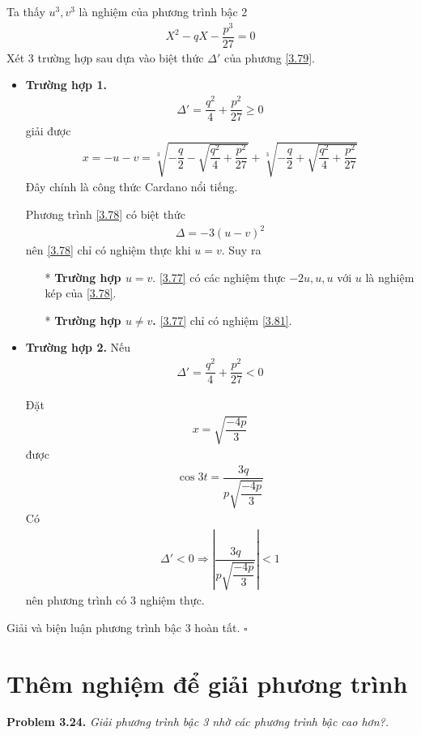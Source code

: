 \documentclass[a4paper,oneside]{book}
\numberwithin{equation}{chapter}
\begin{document}
Ta thấy ${u^3},{v^3}$ là nghiệm của phương trình bậc 2
\begin{align}
\label{3.79}
{X^2} - qX - \dfrac{{{p^3}}}{{27}} = 0
\end{align}
Xét 3 trường hợp sau dựa vào biệt thức $\Delta '$ của phương \eqref{3.79}.
\begin{itemize}
\item \textbf{Trường hợp 1.} 
\begin{align}
\Delta ' = \dfrac{{{q^2}}}{4} + \dfrac{{{p^2}}}{{27}} \ge 0
\end{align}
giải được 
\begin{align}
\label{3.81}
x =  - u - v = \sqrt[3]{{ - \dfrac{q}{2} - \sqrt {\dfrac{{{q^2}}}{4} + \dfrac{{{p^2}}}{{27}}} }} + \sqrt[3]{{ - \dfrac{q}{2} + \sqrt {\dfrac{{{q^2}}}{4} + \dfrac{{{p^2}}}{{27}}} }}
\end{align}
Đây chính là công thức Cardano nổi tiếng.

Phương trình \eqref{3.78} có biệt thức 
\begin{align}
\Delta  =  - 3{\left( {u - v} \right)^2}
\end{align}
nên \eqref{3.78} chỉ có nghiệm thực khi $u = v$. Suy ra
\begin{itemize}
\item[*] \textbf{Trường hợp $u=v$}. \eqref{3.77} có các nghiệm thực $ - 2u,u,u$ với $u$ là nghiệm kép của \eqref{3.78}.
\item[*] \textbf{Trường hợp $u \ne v$.} \eqref{3.77} chỉ có nghiệm \eqref{3.81}.
\end{itemize}
\item \textbf{Trường hợp 2.} Nếu 
\begin{align}
\Delta ' = \dfrac{{{q^2}}}{4} + \dfrac{{{p^2}}}{{27}} < 0
\end{align}

Đặt 
\begin{align}
x = \sqrt {\dfrac{{ - 4p}}{3}} 
\end{align}
được 
\begin{align}
\cos 3t = \dfrac{{3q}}{{p\sqrt {\dfrac{{ - 4p}}{3}} }}
\end{align}
Có \begin{align}
\Delta ' < 0 \Rightarrow \left| {\dfrac{{3q}}{{p\sqrt {\dfrac{{ - 4p}}{3}} }}} \right| < 1
\end{align}
nên phương trình có 3 nghiệm thực.
\end{itemize}
Giải và biện luận phương trình bậc 3 hoàn tất. \hfill $\square$
\section{Thêm nghiệm để giải phương trình}
\textbf{Problem 3.24.} \textit{Giải phương trình bậc 3 nhờ các phương trình bậc cao hơn?.}\\
\end{document}
